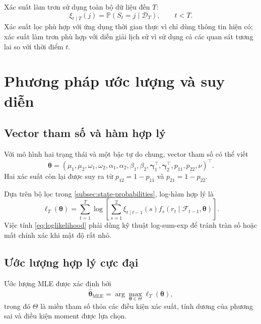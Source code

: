 \documentclass[12pt,a4paper]{article}
\numberwithin{equation}{section}
\newcommand{\bm}[1]{\symbf{#1}}
\newcommand{\Data}{\mathcal{D}}
\newcommand{\Info}{\mathcal{F}}
\newcommand{\Param}{\bm{\theta}}
\newcommand{\Prob}{\mathbb{P}}
\begin{document}
Xác suất làm trơn sử dụng toàn bộ dữ liệu đến $T$:
\begin{equation}
  \xi_{t\mid T}(j)=\Prob(S_t=j\mid\Data_T),
  \qquad t<T.
  \label{eq:smoothed-state-prob}
\end{equation}
Xác suất lọc phù hợp với ứng dụng thời gian thực vì chỉ dùng thông tin hiện có; xác suất làm trơn phù hợp với diễn giải lịch sử vì sử dụng cả các quan sát tương lai so với thời điểm $t$.

\section{Phương pháp ước lượng và suy diễn}\label{sec:suy-dien}

\subsection{Vector tham số và hàm hợp lý}\label{subsec:likelihood}

Với mô hình hai trạng thái và một bậc tự do chung, vector tham số có thể viết
\begin{equation}
  \Param
  =
  \left(
  \mu_1,\mu_2,
  \omega_1,\omega_2,
  \alpha_1,\alpha_2,
  \beta_1,\beta_2,
  \bm\gamma_1^{\top},\bm\gamma_2^{\top},
  p_{11},p_{22},
  \nu
  \right)^{\top}.
  \label{eq:parameter-vector}
\end{equation}
Hai xác suất còn lại được suy ra từ $p_{12}=1-p_{11}$ và $p_{21}=1-p_{22}$.

Dựa trên bộ lọc trong \cref{subsec:state-probabilities}, log-hàm hợp lý là
\begin{equation}
  \ell_T(\Param)
  =
  \sum_{t=1}^{T}
  \log\left[
    \sum_{s=1}^{2}
    \xi_{t\mid t-1}(s)
    f_s(r_t\mid\Info_{t-1},\Param)
  \right].
  \label{eq:loglikelihood}
\end{equation}
Việc tính \cref{eq:loglikelihood} phải dùng kỹ thuật log-sum-exp để tránh tràn số hoặc mất chính xác khi mật độ rất nhỏ.

\subsection{Ước lượng hợp lý cực đại}\label{subsec:mle}

Ước lượng MLE được xác định bởi
\begin{equation}
  \widehat{\Param}_{\mathrm{MLE}}
  =
  \arg\max_{\Param\in\Theta}\ell_T(\Param),
  \label{eq:mle}
\end{equation}
trong đó $\Theta$ là miền tham số thỏa các điều kiện xác suất, tính dương của phương sai và điều kiện moment được lựa chọn.
\end{document}
